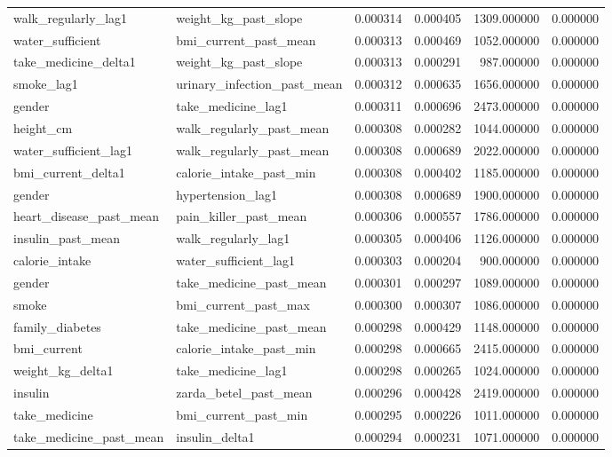 \begin{longtable}{llrrrr}
walk\_regularly\_lag1 & weight\_kg\_past\_slope & 0.000314 & 0.000405 & 1309.000000 & 0.000000 \\
water\_sufficient & bmi\_current\_past\_mean & 0.000313 & 0.000469 & 1052.000000 & 0.000000 \\
take\_medicine\_delta1 & weight\_kg\_past\_slope & 0.000313 & 0.000291 & 987.000000 & 0.000000 \\
smoke\_lag1 & urinary\_infection\_past\_mean & 0.000312 & 0.000635 & 1656.000000 & 0.000000 \\
gender & take\_medicine\_lag1 & 0.000311 & 0.000696 & 2473.000000 & 0.000000 \\
height\_cm & walk\_regularly\_past\_mean & 0.000308 & 0.000282 & 1044.000000 & 0.000000 \\
water\_sufficient\_lag1 & walk\_regularly\_past\_mean & 0.000308 & 0.000689 & 2022.000000 & 0.000000 \\
bmi\_current\_delta1 & calorie\_intake\_past\_min & 0.000308 & 0.000402 & 1185.000000 & 0.000000 \\
gender & hypertension\_lag1 & 0.000308 & 0.000689 & 1900.000000 & 0.000000 \\
heart\_disease\_past\_mean & pain\_killer\_past\_mean & 0.000306 & 0.000557 & 1786.000000 & 0.000000 \\
insulin\_past\_mean & walk\_regularly\_lag1 & 0.000305 & 0.000406 & 1126.000000 & 0.000000 \\
calorie\_intake & water\_sufficient\_lag1 & 0.000303 & 0.000204 & 900.000000 & 0.000000 \\
gender & take\_medicine\_past\_mean & 0.000301 & 0.000297 & 1089.000000 & 0.000000 \\
smoke & bmi\_current\_past\_max & 0.000300 & 0.000307 & 1086.000000 & 0.000000 \\
family\_diabetes & take\_medicine\_past\_mean & 0.000298 & 0.000429 & 1148.000000 & 0.000000 \\
bmi\_current & calorie\_intake\_past\_min & 0.000298 & 0.000665 & 2415.000000 & 0.000000 \\
weight\_kg\_delta1 & take\_medicine\_lag1 & 0.000298 & 0.000265 & 1024.000000 & 0.000000 \\
insulin & zarda\_betel\_past\_mean & 0.000296 & 0.000428 & 2419.000000 & 0.000000 \\
take\_medicine & bmi\_current\_past\_min & 0.000295 & 0.000226 & 1011.000000 & 0.000000 \\
take\_medicine\_past\_mean & insulin\_delta1 & 0.000294 & 0.000231 & 1071.000000 & 0.000000 \\

\end{longtable}
